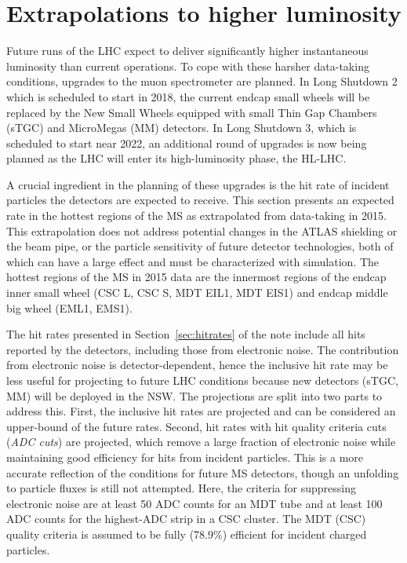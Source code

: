 \section{Extrapolations to higher luminosity}
\label{sec:extrapolations}

Future runs of the LHC expect to deliver significantly higher instantaneous luminosity than current operations. To cope with these harsher data-taking conditions, upgrades to the muon spectrometer are planned. In Long Shutdown 2 which is scheduled to start in 2018, the current endcap small wheels will be replaced by the New Small Wheels equipped with small Thin Gap Chambers (sTGC) and MicroMegas (MM) detectors. In Long Shutdown 3, which is scheduled to start near 2022, an additional round of upgrades is now being planned as the LHC will enter its high-luminosity phase, the HL-LHC.


A crucial ingredient in the planning of these upgrades is the hit rate of incident particles the detectors are expected to receive. This section presents an expected rate in the hottest regions of the MS as extrapolated from data-taking in 2015. This extrapolation does not address potential changes in the ATLAS shielding or the beam pipe, or the particle sensitivity of future detector technologies, both of which can have a large effect and must be characterized with simulation. The hottest regions of the MS in 2015 data are the innermost regions of the endcap inner small wheel (CSC L, CSC S, MDT EIL1, MDT EIS1) and endcap middle big wheel (EML1, EMS1).

The hit rates presented in Section~\ref{sec:hitrates} of the note include all hits reported by the detectors, including those from electronic noise. The contribution from electronic noise is detector-dependent, hence the inclusive hit rate may be less useful for projecting to future LHC conditions because new detectors (sTGC, MM) will be deployed in the NSW. The projections are split into two parts to address this. First, the inclusive hit rates are projected and can be considered an upper-bound of the future rates. Second, hit rates with hit quality criteria cuts (\textit{ADC cuts}) are projected, which remove a large fraction of electronic noise while maintaining good efficiency for hits from incident particles. This is a more accurate reflection of the conditions for future MS detectors, though an unfolding to particle fluxes is still not attempted. Here, the criteria for suppressing electronic noise are at least 50 ADC counts for an MDT tube and at least 100 ADC counts for the highest-ADC strip in a CSC cluster. The MDT (CSC) quality criteria is assumed to be fully (78.9\%) efficient for incident charged particles.

